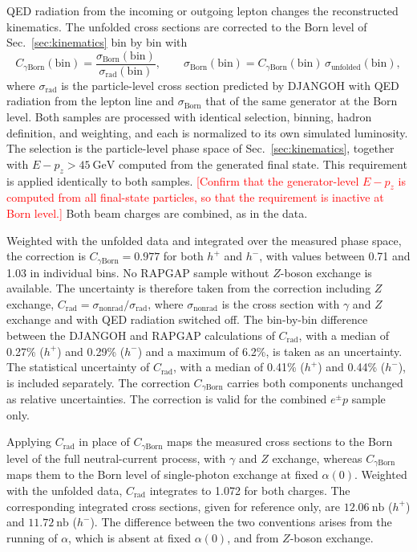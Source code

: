\documentclass[11pt,a4paper]{article}
\newcommand{\hplus}{h^{+}}
\newcommand{\hminus}{h^{-}}
\newcommand{\GeV}{\mathrm{GeV}}
\newcommand{\nb}{\mathrm{nb}}
\newcommand{\Crad}{C_{\mathrm{rad}}}
\newcommand{\Cgam}{C_{\gamma\mathrm{Born}}}
\newcommand{\draft}[1]{\textcolor{red}{#1}}
\begin{document}
QED radiation from the incoming or outgoing lepton changes the reconstructed kinematics. The unfolded cross sections are corrected to the Born level of Sec.~\ref{sec:kinematics} bin by bin with
\begin{equation}
  \Cgam(\mathrm{bin})=\frac{\sigma_{\mathrm{Born}}(\mathrm{bin})}{\sigma_{\mathrm{rad}}(\mathrm{bin})}, \qquad \sigma_{\mathrm{Born}}(\mathrm{bin})=\Cgam(\mathrm{bin})\,\sigma_{\mathrm{unfolded}}(\mathrm{bin}),
\end{equation}
where $\sigma_{\mathrm{rad}}$ is the particle-level cross section predicted by DJANGOH with QED radiation from the lepton line and $\sigma_{\mathrm{Born}}$ that of the same generator at the Born level. Both samples are processed with identical selection, binning, hadron definition, and weighting, and each is normalized to its own simulated luminosity. The selection is the particle-level phase space of Sec.~\ref{sec:kinematics}, together with $E-p_{z}>45~\GeV$ computed from the generated final state. This requirement is applied identically to both samples. \draft{[Confirm that the generator-level $E-p_{z}$ is computed from all final-state particles, so that the requirement is inactive at Born level.]} Both beam charges are combined, as in the data.

Weighted with the unfolded data and integrated over the measured phase space, the correction is $\Cgam=0.977$ for both $\hplus$ and $\hminus$, with values between 0.71 and 1.03 in individual bins. No RAPGAP sample without $Z$-boson exchange is available. The uncertainty is therefore taken from the correction including $Z$ exchange, $\Crad=\sigma_{\mathrm{nonrad}}/\sigma_{\mathrm{rad}}$, where $\sigma_{\mathrm{nonrad}}$ is the cross section with $\gamma$ and $Z$ exchange and with QED radiation switched off. The bin-by-bin difference between the DJANGOH and RAPGAP calculations of $\Crad$, with a median of 0.27\% ($\hplus$) and 0.29\% ($\hminus$) and a maximum of 6.2\%, is taken as an uncertainty. The statistical uncertainty of $\Crad$, with a median of 0.41\% ($\hplus$) and 0.44\% ($\hminus$), is included separately. The correction $\Cgam$ carries both components unchanged as relative uncertainties. The correction is valid for the combined $e^{\pm}p$ sample only.

Applying $\Crad$ in place of $\Cgam$ maps the measured cross sections to the Born level of the full neutral-current process, with $\gamma$ and $Z$ exchange, whereas $\Cgam$ maps them to the Born level of single-photon exchange at fixed $\alpha(0)$. Weighted with the unfolded data, $\Crad$ integrates to 1.072 for both charges. The corresponding integrated cross sections, given for reference only, are $12.06~\nb$ ($\hplus$) and $11.72~\nb$ ($\hminus$). The difference between the two conventions arises from the running of $\alpha$, which is absent at fixed $\alpha(0)$, and from $Z$-boson exchange.
\end{document}
